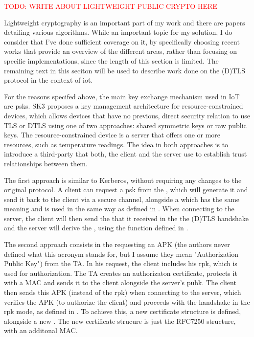 \documentclass{llncs}
\newcommand{\todo}[1]{\textcolor{red}{TODO: #1}\PackageWarning{TODO:}{#1!}}
\begin{document}
\todo{WRITE ABOUT LIGHTWEIGHT PUBLIC CRYPTO HERE}

Lightweight cryptography is an important part of my work and there are papers detailing
various algorithms. While an important topic for my solution, I do consider that
I've done sufficient coverage on it, by specifically choosing recent works that
provide an overview of the different areas, rather than focusing on specific
implementations, since the length of this section is limited. The remaining text
in this seciton will be used to describe work done on the (D)TLS protocol in the
context of \gls{iot}.

For the reasons specifed above, the main key exchange mechanism used in IoT
are \gls{psk}s. SK3\cite{S3KScala62:online} proposes a key management architecture for resource-constrained devices,
which allows devices that have no previous, direct security relation to use
TLS or DTLS using one of two approaches: shared symmetric keys or raw public keys.
The resource-constrained device is a server that offers one or more resources,
such as temperature readings. The idea in both approaches is to introduce a third-party
 that both, the client and the server use to establish
trust relationships between them.

The first approach is similar to Kerberos\cite{todo}, without requiring any
changes to the original protocol. A client can request a \gls{psk}  from the ,
which will generate it and send it back to the client via a secure channel, alongside
a  which has the same meaning and is used in the same way
as defined in \cite{todo}. When connecting to the server,
the client will then send the  that it received in the
the (D)TLS handshake and the server will derive the , using the
 function defined in \cite{RFC5246}.

The second approach consists in the   requesting an APK (the authors never defined
what this acronym stands for, but I assume they mean "Authorization Public Key")
from the TA. In his request,
the client includes his \gls{rpk}, which is used for authorization. The TA
creates an authorizaton certificate, protects it with a MAC and sends it
to the client alongside the server's \gls{pubk}.
The client then sends this APK (instead of the \gls{rpk})
when connecting to the server, which verifies the APK (to authorize the client)
and proceeds with the handshake in the \gls{rpk} mode, as defined in \cite{todo psk rfc}.
To achieve this, a new certificate structure is defined, alongside a new .
The new certificate strucure is just the RFC7250 \cite{RFC7250} structure, with an
additonal MAC.
\end{document}
